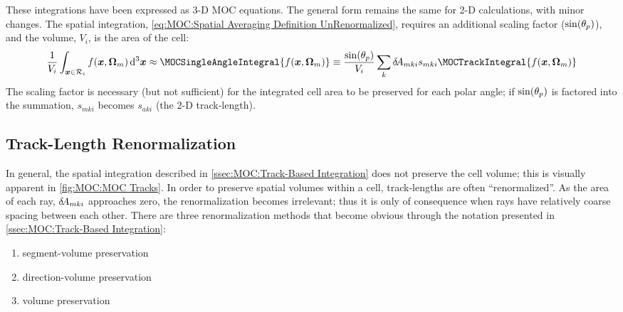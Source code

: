 {{{            These integrations have been expressed as 3-D \ac{MOC} equations.
            The general form remains the same for 2-D calculations, with minor changes.
            The spatial integration, \cref{eq:MOC:Spatial Averaging Definition UnRenormalized}, requires an additional scaling factor ($\sin(\theta_p)$), and the volume, $V_i$, is the area of the cell:
            \begin{equation}
              \label{eq:MOC:Spatial Averaging Definition UnRenormalized 2D}
              \frac{1}{V_i}\intl[\loc\in\Region]f(\loc,\dirm)\dif^3{\loc} \approx \MOCSingleAngleIntegral{f(\loc,\dirm)} \defined \frac{\sin(\Polar_p)}{V_i}\suml[k]\tA[mki]\segl\MOCTrackIntegral{f(\loc,\dirm)}
            \end{equation}
            The scaling factor is necessary (but not sufficient) for the integrated cell area to be preserved for each polar angle;
            if $\sin(\theta_p)$ is factored into the summation, $s_{mki}$ becomes $s_{aki}$ (the 2-D track-length).
        }
        \subsection{Track-Length Renormalization}{\label{sec:MOC:Track-Length Renormalization}
            In general, the spatial integration described in \cref{ssec:MOC:Track-Based Integration} does not preserve the cell volume; this is visually apparent in \cref{fig:MOC:MOC Tracks}.
            In order to preserve spatial volumes within a cell, track-lengths are often ``renormalized''.
            As the area of each ray, $\tA[mki]$ approaches zero, the renormalization becomes irrelevant; thus it is only of consequence when rays have relatively coarse spacing between each other.
            There are three renormalization methods that become obvious through the notation presented in \cref{ssec:MOC:Track-Based Integration}:
            \begin{enumerate}
                \item{segment-volume preservation}
                \item{direction-volume preservation}
                \item{volume preservation}
            \end{enumerate}

}}}
